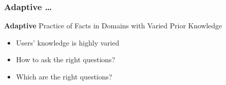 \documentclass[xcolor=svgnames]{beamer}
\begin{document}
\begin{frame}
	\frametitle{Adaptive \ldots}
   \textbf{Adaptive} Practice of Facts in Domains with Varied Prior Knowledge
	\begin{itemize}
    \item Users' knowledge is highly varied
    \item How to ask the right questions?
    \item Which are the right questions?
    \
	\end{itemize}
\end{frame}
\end{document}
